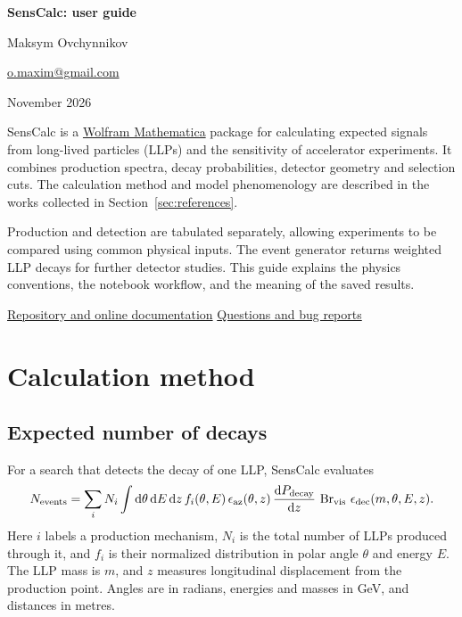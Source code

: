 \begin{center}
  {\LARGE\bfseries SensCalc: user guide}\par
  \vspace{5pt}
  {\large Maksym Ovchynnikov}\par
  \href{mailto:o.maxim@gmail.com}{o.maxim@gmail.com}\par
  November 2026
\end{center}

SensCalc is a \href{https://www.wolfram.com/mathematica/}{Wolfram Mathematica} package for calculating expected signals from long-lived particles (LLPs) and the sensitivity of accelerator experiments. It combines production spectra, decay probabilities, detector geometry and selection cuts. The calculation method and model phenomenology are described in the works collected in Section~\ref{sec:references}.

Production and detection are tabulated separately, allowing experiments to be compared using common physical inputs. The event generator returns weighted LLP decays for further detector studies. This guide explains the physics conventions, the notebook workflow, and the meaning of the saved results.

\href{https://github.com/maksymovchynnikov/SensCalc}{Repository and online documentation}
\hfill
\href{https://github.com/maksymovchynnikov/SensCalc/issues}{Questions and bug reports}

\tableofcontents
\clearpage

\section{Calculation method}\label{sec:method}
\subsection{Expected number of decays}
For a search that detects the decay of one LLP, SensCalc evaluates
\begin{equation}\label{eq:yield}
 N_{\mathrm{events}}=\sum_i N_i\int \mathrm{d}\theta\,\mathrm{d} E\,\mathrm{d} z\,
 f_i(\theta,E)\,\epsilon_{\mathrm{az}}(\theta,z)\,
 \frac{\mathrm{d} P_{\mathrm{decay}}}{\mathrm{d} z}\,
 \operatorname{Br}_{\mathrm{vis}}\,\epsilon_{\mathrm{dec}}(m,\theta,E,z).
\end{equation}
Here $i$ labels a production mechanism, $N_i$ is the total number of LLPs produced through it, and $f_i$ is their normalized distribution in polar angle $\theta$ and energy $E$. The LLP mass is $m$, and $z$ measures longitudinal displacement from the production point. Angles are in radians, energies and masses in GeV, and distances in metres.

